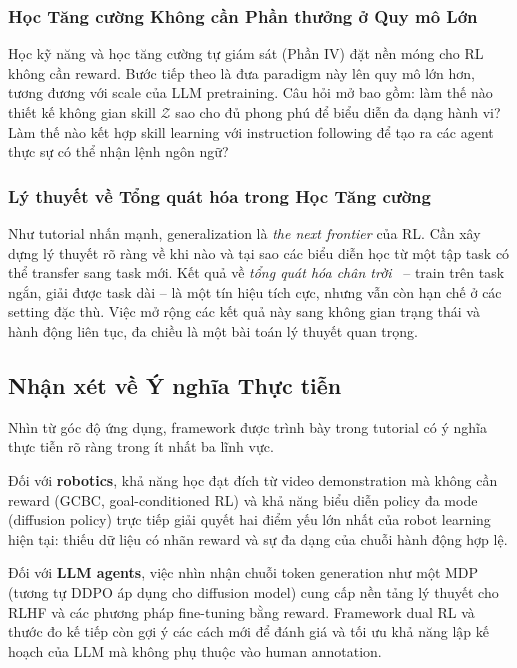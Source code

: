 \subsubsection{Học Tăng cường Không cần Phần thưởng ở Quy mô Lớn}

Học kỹ năng và học tăng cường tự giám sát (Phần IV) đặt nền móng cho RL không cần reward.
Bước tiếp theo là đưa paradigm này lên quy mô lớn hơn, tương đương với scale của LLM pretraining.
Câu hỏi mở bao gồm: làm thế nào thiết kế không gian skill $\mathcal{Z}$ sao cho đủ phong phú
để biểu diễn đa dạng hành vi? Làm thế nào kết hợp skill learning với instruction following để tạo
ra các agent thực sự có thể nhận lệnh ngôn ngữ?

\subsubsection{Lý thuyết về Tổng quát hóa trong Học Tăng cường}

Như tutorial nhấn mạnh, generalization là \textit{the next frontier} của RL.
Cần xây dựng lý thuyết rõ ràng về khi nào và tại sao các biểu diễn học từ một tập task
có thể transfer sang task mới.
Kết quả về \textit{tổng quát hóa chân trời}~\cite{eysenbach2025generativerl} -- train trên task ngắn, giải được
task dài -- là một tín hiệu tích cực, nhưng vẫn còn hạn chế ở các setting đặc thù.
Việc mở rộng các kết quả này sang không gian trạng thái và hành động liên tục, đa chiều là
một bài toán lý thuyết quan trọng.

\subsection{Nhận xét về Ý nghĩa Thực tiễn}

Nhìn từ góc độ ứng dụng, framework được trình bày trong tutorial có ý nghĩa thực tiễn rõ ràng
trong ít nhất ba lĩnh vực.

Đối với \textbf{robotics}, khả năng học đạt đích từ video demonstration mà không cần reward
(GCBC, goal-conditioned RL) và khả năng biểu diễn policy đa mode (diffusion policy) trực tiếp
giải quyết hai điểm yếu lớn nhất của robot learning hiện tại: thiếu dữ liệu có nhãn reward và
sự đa dạng của chuỗi hành động hợp lệ.

Đối với \textbf{LLM agents}, việc nhìn nhận chuỗi token generation như một MDP (tương tự DDPO áp
dụng cho diffusion model) cung cấp nền tảng lý thuyết cho RLHF và các phương pháp fine-tuning
bằng reward.
Framework dual RL và thước đo kế tiếp còn gợi ý các cách mới để đánh giá và tối ưu khả năng
lập kế hoạch của LLM mà không phụ thuộc vào human annotation.

